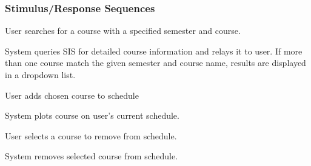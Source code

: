 \documentclass[pdftex,12pt,letter]{article}
\begin{document}
\subsubsection{Stimulus/Response Sequences}
\begin{description}\itemsep1pt
\item[Stimulus:] User searches for a course with a specified semester and course.
\item[Response:] System queries SIS for detailed course information and relays it to user. If more than one course match the given semester and course name, results are displayed in a dropdown list.
\item[Stimulus:] User adds chosen course to schedule
\item[Response:] System plots course on user's current schedule.
\item[Stimulus:] User selects a course to remove from schedule.
\item[Response:] System removes selected course from schedule.
\end{description}
\end{document}
